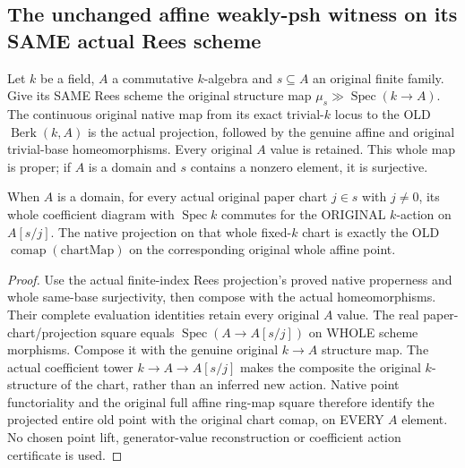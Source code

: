 \subsection{The unchanged affine weakly-psh witness on its SAME actual Rees scheme}
\begin{lemma}
\label{paper:actual-weakly-psh-native-chart-square}

Let $k$ be a field, $A$ a commutative $k$-algebra and $s\subseteq A$ an original
finite family. Give its SAME Rees scheme the original structure map
$\mu_s\gg\operatorname{Spec}(k\to A)$. The continuous original native map
from its exact trivial-$k$ locus to the OLD $\operatorname{Berk}(k,A)$ is the
actual projection, followed by the genuine affine and original trivial-base
homeomorphisms. Every original $A$ value is retained. This whole map is proper;
if $A$ is a domain and $s$ contains a nonzero element, it is surjective.

When $A$ is a domain, for every actual original paper chart $j\in s$ with $j\ne0$, its whole
coefficient diagram with $\operatorname{Spec}k$ commutes for the ORIGINAL
$k$-action on $A[s/j]$. The native projection on that whole fixed-$k$ chart is
exactly the OLD $\operatorname{comap}(\mathrm{chartMap})$ on the corresponding
original whole affine point.
\end{lemma}
\begin{proof}
Use the actual finite-index Rees projection's proved native properness and
whole same-base surjectivity, then compose with the actual homeomorphisms.
Their complete evaluation identities retain every original $A$ value. The real
paper-chart/projection square equals $\operatorname{Spec}(A\to A[s/j])$ on
WHOLE scheme morphisms. Compose it with the genuine original $k\to A$
structure map. The actual coefficient tower $k\to A\to A[s/j]$ makes the
composite the original $k$-structure of the chart, rather than an inferred new
action. Native point functoriality and the original full affine ring-map square
therefore identify the projected entire old point with the original chart comap,
on EVERY $A$ element. No chosen point lift, generator-value reconstruction or
coefficient action certificate is used.
\end{proof}

